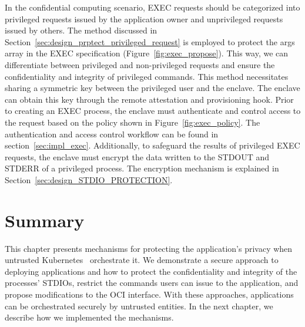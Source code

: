 In the confidential computing scenario, EXEC requests should be categorized into privileged requests issued by the application owner and unprivileged requests issued by others. The method discussed in Section~\ref{sec:design_prptect_privileged_request} is employed to protect the args array in the EXEC specification (Figure~\ref{fig:exec_propose}). This way, 
we can differentiate between privileged and non-privileged requests and ensure the confidentiality and integrity of privileged commands. This method necessitates sharing a symmetric key between the privileged user and the enclave. The enclave can obtain this key through the remote attestation and provisioning hook. Prior to creating an EXEC process,
the enclave must authenticate and control access to the request based on the policy shown in Figure~\ref{fig:exec_policy}. The authentication and access control workflow can be found in section~\ref{sec:impl_exec}. Additionally, to safeguard the results of privileged EXEC requests, the enclave must encrypt the data written to the STDOUT and STDERR of a 
privileged process. The encryption mechanism is explained in Section~\ref{sec:design_STDIO_PROTECTION}.


  

\section{Summary}
This chapter presents mechanisms for protecting the application's privacy when untrusted Kubernetes~\cite*{k8s} orchestrate it. We demonstrate a secure approach to deploying applications and how to protect 
the confidentiality and integrity of the processes' STDIOs, restrict the commands users can issue to the application, and propose modifications to the OCI interface. With these approaches, applications can be orchestrated securely by untrusted entities. 
In the next chapter, we describe how we implemented the mechanisms.
\cleardoublepage

